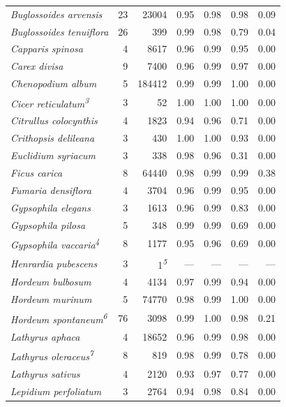 \documentclass[
  authoryear,
  preprint]{elsarticle}
\begin{document}
\begin{longtable}{@{\extracolsep{\fill}}lrrrrrr}
{\itshape Buglossoides arvensis} & 23 & 23004 & 0.95 & 0.98 & 0.98 & 0.09 \\ 
{\itshape Buglossoides tenuiflora} & 26 & 399 & 0.99 & 0.98 & 0.79 & 0.04 \\ 
{\itshape Capparis spinosa} & 4 & 8617 & 0.96 & 0.99 & 0.95 & 0.00 \\ 
{\itshape Carex divisa} & 9 & 7400 & 0.96 & 0.99 & 0.97 & 0.00 \\ 
{\itshape Chenopodium album} & 5 & 184412 & 0.99 & 0.99 & 1.00 & 0.00 \\ 
{\itshape Cicer reticulatum}\textsuperscript{\textit{3}} & 3 & 52 & 1.00 & 1.00 & 1.00 & 0.00 \\ 
{\itshape Citrullus colocynthis} & 4 & 1823 & 0.94 & 0.96 & 0.71 & 0.00 \\ 
{\itshape Crithopsis delileana} & 3 & 430 & 1.00 & 1.00 & 0.93 & 0.00 \\ 
{\itshape Euclidium syriacum} & 3 & 338 & 0.98 & 0.96 & 0.31 & 0.00 \\ 
{\itshape Ficus carica} & 8 & 64440 & 0.98 & 0.99 & 0.99 & 0.38 \\ 
{\itshape Fumaria densiflora} & 4 & 3704 & 0.96 & 0.99 & 0.95 & 0.00 \\ 
{\itshape Gypsophila elegans} & 3 & 1613 & 0.96 & 0.99 & 0.83 & 0.00 \\ 
{\itshape Gypsophila pilosa} & 5 & 348 & 0.99 & 0.99 & 0.69 & 0.00 \\ 
{\itshape Gypsophila vaccaria}\textsuperscript{\textit{4}} & 8 & 1177 & 0.95 & 0.96 & 0.69 & 0.00 \\ 
{\itshape Henrardia pubescens} & 3 & 1\textsuperscript{\textit{5}} & — & — & — & — \\ 
{\itshape Hordeum bulbosum} & 4 & 4134 & 0.97 & 0.99 & 0.94 & 0.00 \\ 
{\itshape Hordeum murinum} & 5 & 74770 & 0.98 & 0.99 & 1.00 & 0.00 \\ 
{\itshape Hordeum spontaneum}\textsuperscript{\textit{6}} & 76 & 3098 & 0.99 & 1.00 & 0.98 & 0.21 \\ 
{\itshape Lathyrus aphaca} & 4 & 18652 & 0.96 & 0.99 & 0.98 & 0.00 \\ 
{\itshape Lathyrus oleraceus}\textsuperscript{\textit{7}} & 8 & 819 & 0.98 & 0.99 & 0.78 & 0.00 \\ 
{\itshape Lathyrus sativus} & 4 & 2120 & 0.93 & 0.97 & 0.77 & 0.00 \\ 
{\itshape Lepidium perfoliatum} & 3 & 2764 & 0.94 & 0.98 & 0.84 & 0.00 \\ 

\end{longtable}
\end{document}
